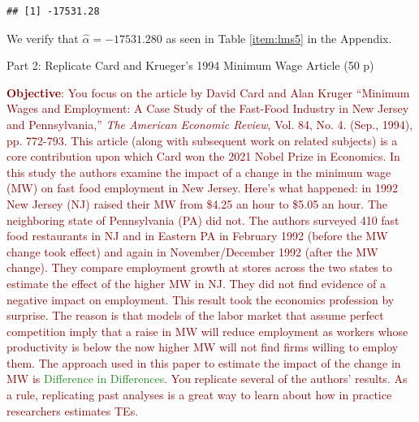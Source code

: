 \documentclass[
]{article}
\newenvironment{Shaded}{\begin{snugshade}}{\end{snugshade}}
\newcommand{\FunctionTok}[1]{\textcolor[rgb]{0.00,0.00,0.00}{#1}}
\newcommand{\NormalTok}[1]{#1}
\newcommand{\SpecialCharTok}[1]{\textcolor[rgb]{0.00,0.00,0.00}{#1}}
\begin{document}
\begin{Shaded}
\end{Shaded}

\begin{verbatim}
## [1] -17531.28
\end{verbatim}

We verify that \(\hat{\alpha} = -17531.280\) as seen in Table
\ref{item:lms5} in the Appendix.

\newpage

\begin{center}
{\LARGE Part 2: Replicate Card and Krueger's 1994 Minimum Wage Article (50 p)}
\end{center}

\noindent \textcolor{Maroon}{\textbf{Objective}: You focus on the article by David Card and Alan Kruger ``Minimum Wages and Employment: A Case Study of the Fast-Food Industry in New Jersey and Pennsylvania,'' \textit{The American Economic Review}, Vol. 84, No. 4. (Sep., 1994), pp. 772-793. This article (along with subsequent work on related subjects) is a core contribution upon which Card won the 2021 Nobel Prize in Economics. In this study the authors examine the impact of a change in the minimum wage (MW) on fast food employment in New Jersey. Here's what happened: in 1992 New Jersey (NJ) raised their MW from \$4.25 an hour to \$5.05 an hour. The neighboring state of Pennsylvania (PA) did not. The authors surveyed 410 fast food restaurants in NJ and in Eastern PA in February 1992 (before the MW change took effect) and again in November/December 1992 (after the MW change). They compare employment growth at stores across the two states to estimate the effect of the higher MW in NJ. They did not find evidence of a negative impact on employment. This result took the economics profession by surprise. The reason is that models of the labor market that assume perfect competition imply that a raise in MW will reduce employment as workers whose productivity is below the now higher MW will not find firms willing to employ them. The approach used in this paper to estimate the impact of the change in MW is \textcolor{ForestGreen}{Difference in Differences}. You replicate several of the authors' results. As a rule, replicating past analyses is a great way to learn about how in practice researchers estimates TEs.}
\end{document}
